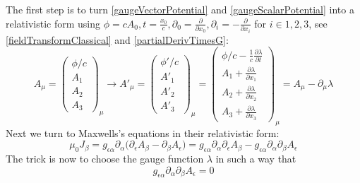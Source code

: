 \documentclass{article}
\begin{document}
The first step is to turn \ref{gaugeVectorPotential} and \ref{gaugeScalarPotential} into a relativistic form using $\phi=c A_0, t=\frac{x_0}{c}, \partial_0 = \frac{\partial}{\partial x_0}, \partial_i = - \frac{\partial}{\partial x_i}$ for $i \in {1,2,3}$, see \ref{fieldTransformClassical} and \ref{partialDerivTimesG}:
\begin{equation}
  A_\mu = \left(\begin{array}{c}
                      \phi /c
                      \\
                      A_1
                      \\
                      A_2
                      \\
                      A_3
          \end{array} \right)_\mu
  \rightarrow
  A'_\mu = \left(\begin{array}{c}
                                \phi' /c
                                \\
                                A'_1
                                \\
                                A'_2
                                \\
                                A'_3
  \end{array} \right)_\mu
  =
  \left(\begin{array}{c}
          \phi /c - \frac{1}{c} \frac{\partial \lambda}{\partial t}
          \\
          A_1 + \frac{\partial \lambda}{\partial x_1}
          \\
          A_2 + \frac{\partial \lambda}{\partial x_2}
          \\
          A_3 + \frac{\partial \lambda}{\partial x_3}
  \end{array} \right)_\mu
  =
  A_\mu - \partial_\mu \lambda
\end{equation}
Next we turn to Maxwells's equations in their relativistic form:
\begin{equation}
  \mu_0 J_\beta = g_{\epsilon\alpha}  \partial_\alpha \big(\partial_\epsilon A_\beta - \partial_\beta A_\epsilon \big)
  = g_{\epsilon\alpha} \partial_\alpha \partial_\epsilon A_\beta - g_{\epsilon\alpha} \partial_\alpha \partial_\beta A_\epsilon
\end{equation}
The trick is now to choose the gauge function $\lambda$ in such a way that
\begin{equation}
  g_{\epsilon\alpha} \partial_\alpha \partial_\beta A_\epsilon = 0
\end{equation}
\end{document}
